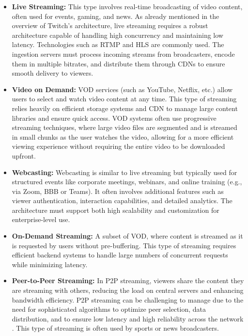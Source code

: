 \begin{itemize}
    \item \textbf{Live Streaming:} This type involves real-time broadcasting of video content, often used for events, gaming, and news. As already mentioned in the overview of Twitch's architecture, live streaming requires a robust architecture capable of handling high concurrency and maintaining low latency. Technologies such as \ac{RTMP} and \ac{HLS} are commonly used. The ingestion servers must process incoming streams from broadcasters, encode them in multiple bitrates, and distribute them through \ac{CDN}s to ensure smooth delivery to viewers\cite{rtmp_hls}.
    \item \textbf{Video on Demand:} \ac{VOD} services (such as YouTube, Netflix, etc.) allow users to select and watch video content at any time. This type of streaming relies heavily on efficient storage systems and \ac{CDN} to manage large content libraries and ensure quick access. \ac{VOD} systems often use progressive streaming techniques, where large video files are segmented and is streamed in small chunks as the user watches the video, allowing for a more efficient viewing experience without requiring the entire video to be downloaded upfront\cite{vod_architecture}.
    \item \textbf{Webcasting:} Webcasting is similar to live streaming but typically used for structured events like corporate meetings, webinars, and online training (e.g., via Zoom, BBB or Teams). It often involves additional features such as viewer authentication, interaction capabilities, and detailed analytics. The architecture must support both high scalability and customization for enterprise-level use\cite{webcasting_tech}.
    \item \textbf{On-Demand Streaming:} A subset of \ac{VOD}, where content is streamed as it is requested by users without pre-buffering. This type of streaming requires efficient backend systems to handle large numbers of concurrent requests while minimizing latency\cite{on_demand_streaming}.
    \item \textbf{Peer-to-Peer Streaming:} In \ac{P2P} streaming, viewers share the content they are streaming with others, reducing the load on central servers and enhancing bandwidth efficiency. \ac{P2P} streaming can be challenging to manage due to the need for sophisticated algorithms to optimize peer selection, data distribution, and to ensure low latency and high reliability across the network \cite{p2p_streaming}. This type of streaming is often used by sports or news broadcasters.
\end{itemize}

